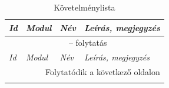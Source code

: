 \documentclass[]{thesis-ekf}
\theoremstyle{definition}
\theoremstyle{remark}
\begin{document}
		\begin{longtable}{|l|l|p{3cm}|p{8cm}|}
			\caption{Követelménylista} \label{kovetelmenylista} \\
			\hline
			\emph{Id} & \emph{Modul} & \emph{Név} & \emph{Leírás, megjegyzés} \\ \hline
			\endfirsthead
			
			\multicolumn{4}{c}{{\tablename\ \thetable{} -- folytatás}} \\
			\hline
			\emph{Id} & \emph{Modul} & \emph{Név} & \emph{Leírás, megjegyzés} \\ \hline
			\endhead
			
			\hline \multicolumn{4}{r}{{Folytatódik a következő oldalon}} \\
			\endfoot
			
			\hline
			\endlastfoot
			

\end{longtable}
\end{document}
